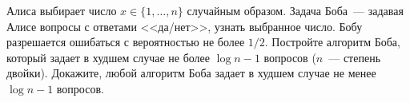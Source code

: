 Алиса выбирает число $x \in \{1, \dots, n\}$ случайным образом. Задача Боба~--- задавая Алисе вопросы с
ответами <<да/нет>>, узнать выбранное число. Бобу разрешается ошибаться с вероятностью не более $1 /
2$. Постройте алгоритм Боба, который задает в худшем случае не более $\log n - 1$ вопросов ($n$~---
степень двойки). Докажите, любой алгоритм Боба задает в худшем случае не менее $\log n - 1$ вопросов.
